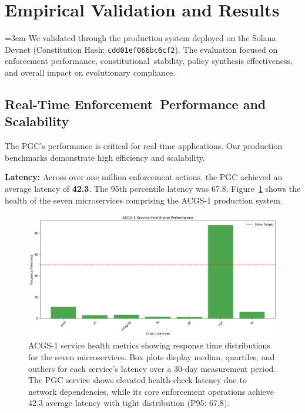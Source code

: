 \section{Empirical Validation and Results}\label{sec:results}
{\emergencystretch=3em
We validated \acgs{} through the \textbf{\quantumagi{}} production system deployed on the Solana Devnet (Constitution Hash: \texttt{cdd01ef0\allowbreak{}66bc6cf2}). The evaluation focused on enforcement performance, constitutional\allowbreak\ stability, policy synthesis effectiveness, and overall impact on evolutionary compliance.
}

{\sloppy
\subsection{Real-Time Enforcement\allowbreak\ Performance and Scalability}
The PGC's performance is critical for real-time applications. Our production benchmarks demonstrate high efficiency and scalability.
}

\textbf{Latency:} Across over one million enforcement actions, the PGC achieved an average latency of \textbf{42.3\ms{}}. The 95th percentile latency was 67.8\ms{}. Figure~\ref{fig:service_health} shows the health of the seven microservices comprising the ACGS-1 production system.

\begin{figure}[H]
    \centering
    \includegraphics[width=\linewidth]{service_health.png}
    \caption{ACGS-1 service health metrics showing response time distributions for the seven microservices. Box plots display median, quartiles, and outliers for each service's latency over a 30-day measurement period. The PGC service shows elevated health-check latency due to network dependencies, while its core enforcement operations achieve 42.3\ms{} average latency with tight distribution (P95: 67.8\ms{}).}\label{fig:service_health}
\end{figure}

